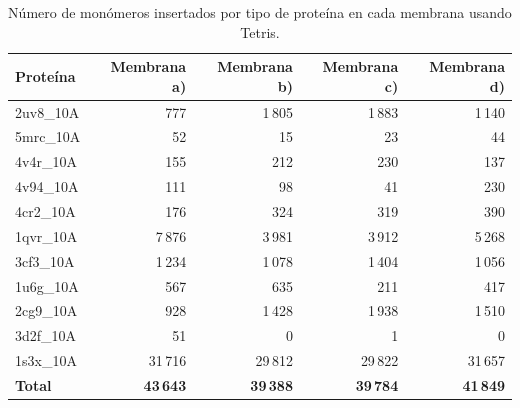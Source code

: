 \begin{table}[h]
\centering
\begin{tabular}{lrrrr}
\toprule
\textbf{Proteína} & \textbf{Membrana a)} & \textbf{Membrana b)} & \textbf{Membrana c)} & \textbf{Membrana d)} \\
\midrule
2uv8\_10A &    777  & 1\,805 & 1\,883 & 1\,140 \\
5mrc\_10A &     52  &    15  &    23  &    44  \\
4v4r\_10A &    155  &   212  &   230  &   137  \\
4v94\_10A &    111  &    98  &    41  &   230  \\
4cr2\_10A &    176  &   324  &   319  &   390  \\
1qvr\_10A &  7\,876 & 3\,981 & 3\,912 & 5\,268 \\
3cf3\_10A &  1\,234 & 1\,078 & 1\,404 & 1\,056 \\
1u6g\_10A &    567  &   635  &   211  &   417  \\
2cg9\_10A &    928  & 1\,428 & 1\,938 & 1\,510 \\
3d2f\_10A &     51  &     0  &     1  &     0  \\
1s3x\_10A & 31\,716 & 29\,812 & 29\,822 & 31\,657 \\
\midrule
\textbf{Total} & \textbf{43\,643} & \textbf{39\,388} & \textbf{39\,784} & \textbf{41\,849} \\
\bottomrule
\end{tabular}
\caption{Número de monómeros insertados por tipo de proteína en cada membrana usando Tetris.}
\label{tab:monomeros}
\end{table}


